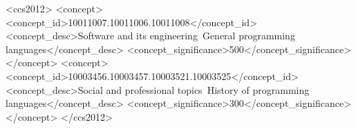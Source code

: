 \documentclass[acmsmall,nonacm]{acmart}\settopmatter{printfolios=true,printccs=false,printacmref=false}
\begin{document}
\begin{CCSXML}
<ccs2012>
<concept>
<concept_id>10011007.10011006.10011008</concept_id>
<concept_desc>Software and its engineering~General programming languages</concept_desc>
<concept_significance>500</concept_significance>
</concept>
<concept>
<concept_id>10003456.10003457.10003521.10003525</concept_id>
<concept_desc>Social and professional topics~History of programming languages</concept_desc>
<concept_significance>300</concept_significance>
</concept>
</ccs2012>
\end{CCSXML}





\maketitle









\end{document}
